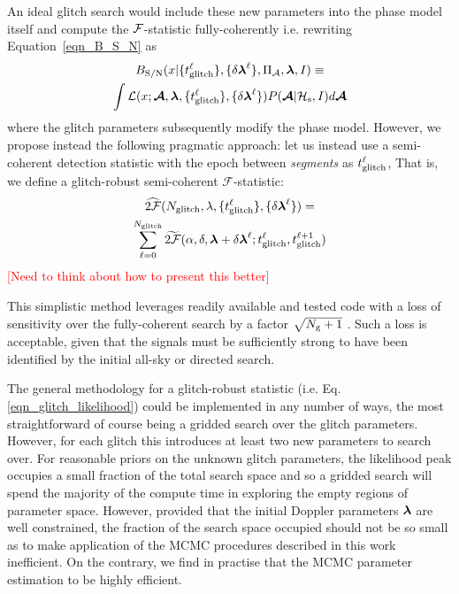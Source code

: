 \documentclass[aps, prd, twocolumn, superscriptaddress, floatfix, showpacs, nofootinbib, longbibliography]{revtex4-1}
\newcommand{\comment}[1]{\textcolor{red}{[#1]}}
\begin{document}
An ideal glitch search would include these new parameters into the phase model
itself and compute the ${\mathcal{F}}$-statistic fully-coherently i.e. rewriting
Equation~\eqref{eqn_B_S_N} as
\begin{multline}
B_{\rm S/N}(x| \{t_{\rm glitch}^\ell\}, \{\delta\boldsymbol{\mathbf{\lambda}}^\ell\}, \Pi_\mathcal{A}, \boldsymbol{\mathbf{\lambda}}, I) \equiv \\
\int
\mathcal{L}(x ;\boldsymbol{\mathcal{A}}, \boldsymbol{\mathbf{\lambda}}, \{t_{\rm glitch}^\ell\}, \{\delta\boldsymbol{\mathbf{\lambda}}^\ell\})
P(\boldsymbol{\mathcal{A}}| \mathcal{H}_{\rm s}, I) d\boldsymbol{\mathcal{A}}
\end{multline}
where the glitch parameters subsequently modify the phase model. However, we
propose instead the following pragmatic approach: let us instead use a
semi-coherent detection statistic with the epoch between \emph{segments} as
$t_{\rm glitch}^\ell$, That is, we define a glitch-robust semi-coherent 
$\mathcal{F}$-statistic:
\begin{multline}
\widehat{2{\mathcal{F}}}(N_{\rm glitch}, \lambda, \{t_{\rm glitch}^\ell\}, \{\delta\boldsymbol{\mathbf{\lambda}}^{\ell}\})= \\
\sum_{\ell=0}^{N_{\rm glitch}}
\widetilde{2{\mathcal{F}}}(\alpha, \delta, \boldsymbol{\mathbf{\lambda}}+\delta\boldsymbol{\mathbf{\lambda}}^\ell;
t_{\rm glitch}^\ell, t_{\rm glitch}^{\ell+1})
\label{eqn_glitch_likelihood}
\end{multline}
\comment{Need to think about how to present this better}

This simplistic method leverages readily available and tested code with a loss
of sensitivity over the fully-coherent search by a factor $\sqrt{N_{\rm g}+1}$
\citep{wette2015}. Such a loss is acceptable, given that the signals must be
sufficiently strong to have been identified by the initial all-sky or directed
search.

The general methodology for a glitch-robust statistic (i.e.
Eq.\eqref{eqn_glitch_likelihood}) could be implemented in any number of ways,
the most straightforward of course being a gridded search over the glitch
parameters. However, for each glitch this introduces at least two new
parameters to search over. For reasonable priors on the unknown glitch
parameters, the likelihood peak occupies a small fraction of the total search
space and so a gridded search will spend the majority of the compute time in
exploring the empty regions of parameter space. However, provided that the
initial Doppler parameters $\boldsymbol{\mathbf{\lambda}}$ are well constrained, the fraction of the
search space occupied should not be so small as to make application of the MCMC
procedures described in this work inefficient. On the contrary, we find in
practise that the MCMC parameter estimation to be highly efficient.
\end{document}
